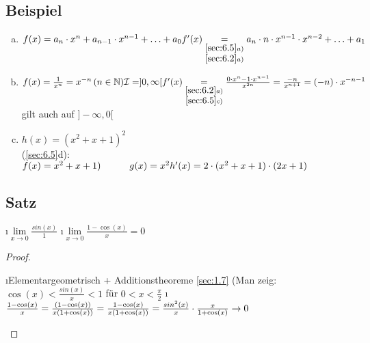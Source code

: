 \subsection{Beispiel}
\begin{enumerate}[a)]
\item $f(x) = a_n \cdot x^n + a_{n-1} \cdot x^{n-1} + \ldots + a_0\\
f'(x) \underset{\substack{\ref{sec:6.5}a)\\
\ref{sec:6.2}a)}}{=} a_n \cdot n \cdot x^{n-1} \cdot x^{n-2} + \ldots + a_1$
\item $f(x) = \frac{1}{x^n} = x^{-n} \, (n \in \mathbb{N})\\
\mathcal{I} = ]0,\infty[\\
f'(x) \underset{\substack{\ref{sec:6.2}a)\\
\ref{sec:6.5}c)}}{=} \frac{0 \cdot x^n - 1 \cdot x^{n-1}}{x^{2n}} = \frac{-n}{x^{n+1}} = (-n) \cdot x^{-n-1}$ gilt auch auf $]-\infty,0[$
\item $h(x) = (x^2 + x + 1)^2$\\
(\ref{sec:6.5}d): $f(x) = x^2 + x + 1)\\
\hspace*{1.05cm}g(x)= x^2\\
h'(x) = 2 \cdot (x^2 + x + 1) \cdot (2x + 1)$
\end{enumerate}
\subsection[Satz:]{Satz}\label{sec:6.7}
\begin{enumerate}[a)]
\i $\lim\limits_{x \to 0} \frac{sin(x)}{1}$
\i $\lim\limits_{x \to 0} \frac{1-\cos(x)}{x} = 0$
\end{enumerate}
\begin{proof}\ \\
\begin{enumerate}[a)]
\i Elementargeometrisch + Additionstheoreme \ref{sec:1.7}
(Man zeig: $\cos(x) < \frac{sin(x)}{x} < 1$ für $0 < x < \frac{\pi}{2}$
\i $\frac{1-\cos(x)}{x} = \frac{(1-\cos(x))}{x(1+\cos(x))} = \frac{1-\cos(x)}{x(1 + \cos(x))} = \frac{sin^2(x)}{x} \cdot \frac{x}{1 + \cos(x)} \to 0$
\end{enumerate}
\end{proof}
